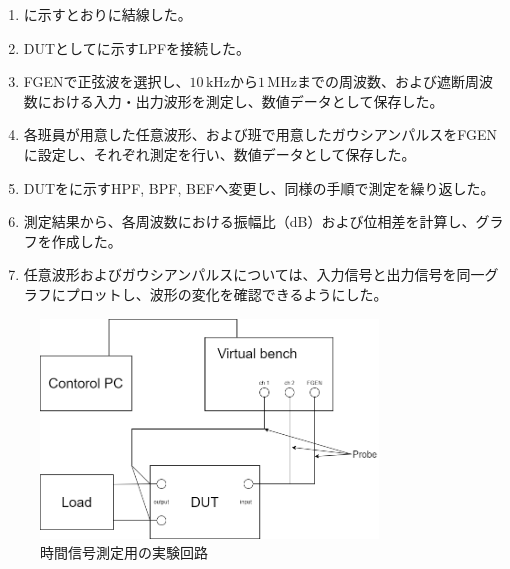\documentclass[11pt,dvipdfmx]{jarticle}
\begin{document}
\begin{enumerate}
  \item {}に示すとおりに結線した。
  \item DUTとしてに示すLPFを接続した。
  \item FGENで正弦波を選択し、$10\,\mathrm{kHz}$から$1\,\mathrm{MHz}$までの周波数、および遮断周波数における入力・出力波形を測定し、数値データとして保存した。
  \item 各班員が用意した任意波形、および班で用意したガウシアンパルスをFGENに設定し、それぞれ測定を行い、数値データとして保存した。
  \item DUTをに示すHPF, BPF, BEFへ変更し、同様の手順で測定を繰り返した。
  \item 測定結果から、各周波数における振幅比（dB）および位相差を計算し、グラフを作成した。
  \item 任意波形およびガウシアンパルスについては、入力信号と出力信号を同一グラフにプロットし、波形の変化を確認できるようにした。
\end{enumerate}
\begin{figure}[H]
  \centering
  \includegraphics[width=0.8\textwidth]{fig/VirtualBench.drawio.png}
  \caption{時間信号測定用の実験回路}
  \label{fig:実験回路1}  
\end{figure}
\end{document}

